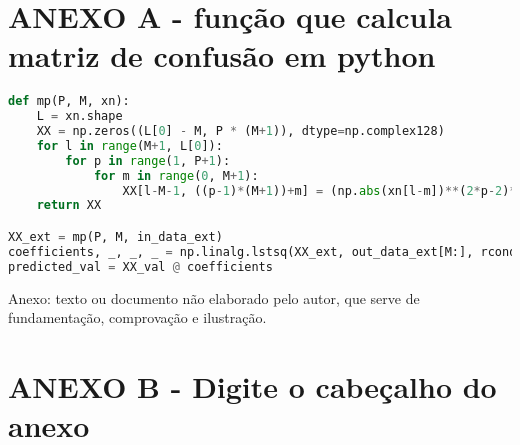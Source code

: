 \chapter*{\normalsize ANEXO A - função que calcula matriz de confusão em python}
\small %
\begin{lstlisting}[language = Python, label={cod:mp}]
def mp(P, M, xn):
    L = xn.shape
    XX = np.zeros((L[0] - M, P * (M+1)), dtype=np.complex128)
    for l in range(M+1, L[0]):
        for p in range(1, P+1):
            for m in range(0, M+1):
                XX[l-M-1, ((p-1)*(M+1))+m] = (np.abs(xn[l-m])**(2*p-2)*(xn[l-m]))[0]
    return XX

XX_ext = mp(P, M, in_data_ext)
coefficients, _, _, _ = np.linalg.lstsq(XX_ext, out_data_ext[M:], rcond=None)
predicted_val = XX_val @ coefficients

\end{lstlisting}
Anexo: texto ou documento não elaborado pelo autor, que serve de fundamentação, comprovação e ilustração.

\chapter*{\normalsize ANEXO B - Digite o cabeçalho do anexo}